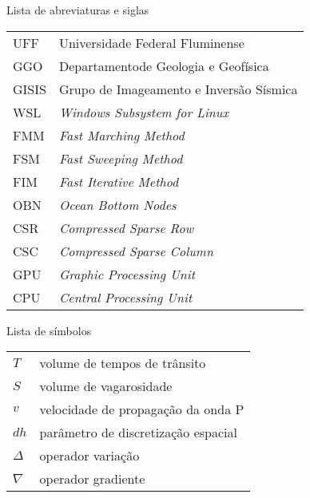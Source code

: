 \listoffigures*
\cleardoublepage

\listoftables*
\cleardoublepage

\begin{center}
\fonteLista Lista de abreviaturas e siglas 
\end{center}

\vspace{2cm}
\fonteNormalSize
\begin{tabular}{l l}
    UFF & Universidade Federal Fluminense \\ [1.0ex]
    GGO & Departamentode Geologia e Geofísica \\ [1.0ex]
    GISIS & Grupo de Imageamento e Inversão Sísmica \\ [1.0ex]
	WSL & \textit{Windows Subsystem for Linux} \\ [1.0ex]
	FMM & \textit{Fast Marching Method} \\ [1.0ex]
	FSM & \textit{Fast Sweeping Method} \\ [1.0ex]
	FIM & \textit{Fast Iterative Method} \\ [1.0ex]
	OBN & \textit{Ocean Bottom Nodes} \\ [1.0ex]
	CSR & \textit{Compressed Sparse Row} \\ [1.0ex]
	CSC & \textit{Compressed Sparse Column} \\ [1.0ex]
	GPU & \textit{Graphic Processing Unit} \\ [1.0ex]
	CPU & \textit{Central Processing Unit}
\end{tabular}
\cleardoublepage


\begin{center}
    \fonteLista Lista de símbolos
\end{center}

\vspace{2cm}
\fonteNormalSize
\begin{tabular}{l l}
    $ T $ & volume de tempos de trânsito \\ [1.0ex]
    $ S $ & volume de vagarosidade \\ [1.0ex] 
    $ v $ & velocidade de propagação da onda P \\ [1.0ex]
    $ dh $ & parâmetro de discretização espacial \\ [1.0ex]
    $ \Delta $ & operador variação \\ [1.0ex]
    $ \nabla $ & operador gradiente \\ [1.0ex]
\end{tabular}

    
